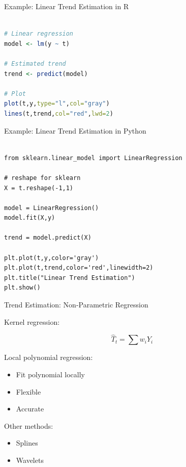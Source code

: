 \documentclass[aspectratio=169]{beamer}
\begin{document}
\begin{frame}[fragile]{Example: Linear Trend Estimation in R}

\begin{lstlisting}[language=R]

# Linear regression
model <- lm(y ~ t)

# Estimated trend
trend <- predict(model)

# Plot
plot(t,y,type="l",col="gray")
lines(t,trend,col="red",lwd=2)

\end{lstlisting}

\end{frame}

\begin{frame}[fragile]{Example: Linear Trend Estimation in Python}

\begin{lstlisting}

from sklearn.linear_model import LinearRegression

# reshape for sklearn
X = t.reshape(-1,1)

model = LinearRegression()
model.fit(X,y)

trend = model.predict(X)

plt.plot(t,y,color='gray')
plt.plot(t,trend,color='red',linewidth=2)
plt.title("Linear Trend Estimation")
plt.show()

\end{lstlisting}

\end{frame}



\begin{frame}{Trend Estimation: Non-Parametric Regression}

Kernel regression:

\[
\hat{T}_t =
\sum w_i Y_i
\]

Local polynomial regression:

\begin{itemize}

\item Fit polynomial locally

\item Flexible

\item Accurate

\end{itemize}

Other methods:

\begin{itemize}

\item Splines

\item Wavelets

\end{itemize}

\end{frame}
\end{document}
